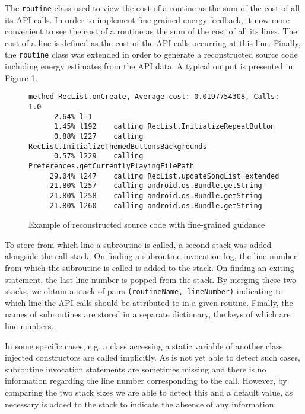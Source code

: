 The \texttt{routine} class used to view the cost of a routine as the sum 
of the cost of all its API calls. In order to implement fine-grained 
energy feedback, it now more convenient to see the cost of a routine as 
the sum of the cost of all its lines. The cost of a line is defined as 
the cost of the API calls occurring at this line. Finally, the 
\texttt{routine} class was extended in order to generate a reconstructed 
source code including energy estimates from the API data. A typical 
output is presented in Figure \ref{fig:sourcelinefeedback}.

\begin{figure}
\centering
\begin{lstlisting}
method RecList.onCreate, Average cost: 0.0197754308, Calls: 1.0
      2.64% l-1
      1.45% l192    calling RecList.InitializeRepeatButton
      0.88% l227    calling RecList.InitializeThemedButtonsBackgrounds
      0.57% l229    calling Preferences.getCurrentlyPlayingFilePath
     29.04% l247    calling RecList.updateSongList_extended
     21.80% l257    calling android.os.Bundle.getString
     21.80% l258    calling android.os.Bundle.getString
     21.80% l260    calling android.os.Bundle.getString
\end{lstlisting}
\caption{Example of reconstructed source code with fine-grained guidance}
\label{fig:sourcelinefeedback}
\vspace{-0.32in}
\end{figure}

To store from which line a subroutine is called, a second stack was 
added alongside the call stack. On finding a subroutine invocation log, 
the line number from which the subroutine is called is added to the 
stack. On finding an exiting statement, the last line number is popped 
from the stack. By merging these two stacks, we obtain a stack of pairs 
\texttt{(routineName, lineNumber)} indicating to which line the API 
calls should be attributed to in a given routine. Finally, the names of 
subroutines are stored in a separate dictionary, the keys of which are 
line numbers.

In some specific cases, e.g. a class accessing a static variable of 
another class, injected constructors are called implicitly. As \Orka{} 
is not yet able to detect such cases, subroutine invocation statements 
are sometimes missing and there is no information regarding the line 
number corresponding to the call. However, by comparing the two stack 
sizes we are able to detect this and a default value, as necessary is 
added to the stack to indicate the absence of any information.
